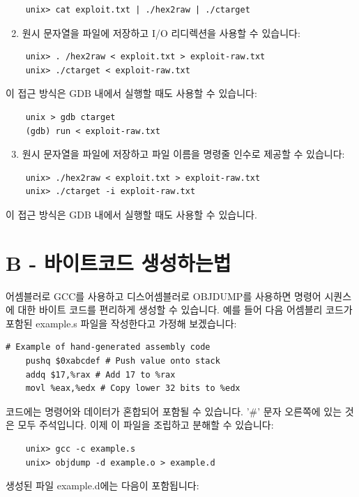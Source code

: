 \documentclass[10pt]{article}
\begin{document}
\begin{verbatim}
    unix> cat exploit.txt | ./hex2raw | ./ctarget
\end{verbatim}

\begin{enumerate}
  \setcounter{enumi}{1}
  \item 원시 문자열을 파일에 저장하고 I/O 리디렉션을 사용할 수 있습니다:
\end{enumerate}

\begin{verbatim}
    unix> . /hex2raw < exploit.txt > exploit-raw.txt
    unix> ./ctarget < exploit-raw.txt
\end{verbatim}
\noindent
이 접근 방식은 GDB 내에서 실행할 때도 사용할 수 있습니다:

\begin{verbatim}
    unix > gdb ctarget
    (gdb) run < exploit-raw.txt
\end{verbatim}

\begin{enumerate}
  \setcounter{enumi}{2}
  \item 원시 문자열을 파일에 저장하고 파일 이름을 명령줄 인수로 제공할 수 있습니다:
\end{enumerate}

\begin{verbatim}
    unix> ./hex2raw < exploit.txt > exploit-raw.txt
    unix> ./ctarget -i exploit-raw.txt
\end{verbatim}
\noindent
이 접근 방식은 GDB 내에서 실행할 때도 사용할 수 있습니다.

\section*{B - 바이트코드 생성하는법}
어셈블러로 GCC를 사용하고 디스어셈블러로 OBJDUMP를 사용하면 명령어 시퀀스에 대한 바이트 코드를 편리하게 생성할 수 있습니다. 예를 들어 다음 어셈블리 코드가 포함된 example.s 파일을 작성한다고 가정해 보겠습니다:

\begin{verbatim}
# Example of hand-generated assembly code
    pushq $0xabcdef # Push value onto stack
    addq $17,%rax # Add 17 to %rax
    movl %eax,%edx # Copy lower 32 bits to %edx
\end{verbatim}
\noindent
코드에는 명령어와 데이터가 혼합되어 포함될 수 있습니다. '\#' 문자 오른쪽에 있는 것은 모두 주석입니다.
\noindent
이제 이 파일을 조립하고 분해할 수 있습니다:

\begin{verbatim}
    unix> gcc -c example.s
    unix> objdump -d example.o > example.d
\end{verbatim}
\noindent
생성된 파일 example.d에는 다음이 포함됩니다:
\end{document}
